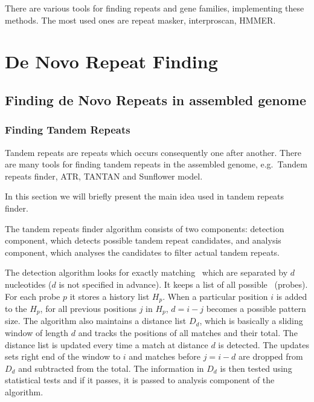 There are various tools for finding repeats and gene families, implementing these methods.
The most used ones are repeat masker\cite{repeatmasker}, interproscan\cite{mitchell2015interpro}, HMMER\cite{eddy2011accelerated}.

\section{De Novo Repeat Finding}


\subsection{Finding de Novo Repeats in assembled genome}


\subsubsection{Finding Tandem Repeats}
Tandem repeats are repeats which occurs consequently one after another. There are many tools for finding tandem repeats in the assembled genome, e.g.\ Tandem repeats finder\cite{trf}, ATR\cite{atr}, TANTAN\cite{tantan} and Sunflower model\cite{nanasi2014probabilistic}.

In this section we will briefly present the main idea used in tandem repeats finder.

The tandem repeats finder algorithm consists of two components: detection component, which detects possible tandem repeat candidates, and analysis component, which analyses the candidates to filter actual tandem repeats.

The detection algorithm looks for exactly matching \kmers\ which are separated by $d$ nucleotides ($d$ is not specified in advance). It keeps a list of all possible \kmers\ (probes).
For each probe $p$ it stores a history list $H_p$.
When a particular position $i$ is added to the $H_p$, for all previous positions $j$ in $H_p$, $d = i - j$ becomes a possible pattern size.
The algorithm also maintains a distance list $D_d$, which is basically a sliding window of length $d$ and tracks the positions of all matches and their total. The distance list is updated every time a match at distance $d$ is detected. The updates sets right end of the window to $i$ and matches before $j = i - d$ are dropped from $D_d$ and subtracted from the total. The information in $D_d$ is then tested using statistical tests and if it passes, it is passed to analysis component of the algorithm.

